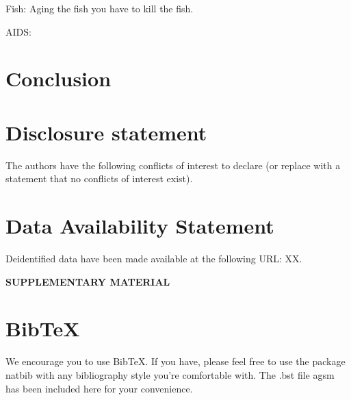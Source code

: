 \documentclass[
  12pt]{article}
\begin{document}
Fish: Aging the fish you have to kill the fish.

AIDS:

\section{Conclusion}\label{sec-conc}

\section{Disclosure statement}\label{disclosure-statement}

The authors have the following conflicts of interest to declare (or
replace with a statement that no conflicts of interest exist).

\section{Data Availability Statement}\label{data-availability-statement}

Deidentified data have been made available at the following URL: XX.

\label{supplementary-material}
\bigskip

\begin{center}

{\large\bf SUPPLEMENTARY MATERIAL}

\end{center}

\section{BibTeX}\label{bibtex}

We encourage you to use BibTeX. If you have, please feel free to use the
package natbib with any bibliography style you're comfortable with. The
.bst file agsm has been included here for your convenience.



\end{document}
